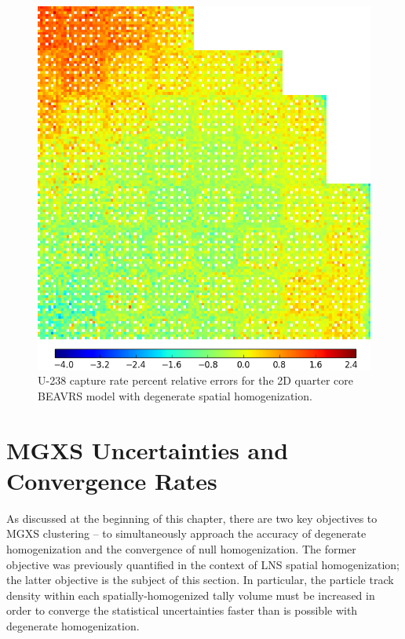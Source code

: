\begin{figure}[h!]
\centering
\includegraphics[width=\linewidth]{figures/patterns/lns/full-core/capt-err-degenerate}
\vspace{2mm}
\caption[U-238 capture rate errors for BEAVRS]{U-238 capture rate percent relative errors for the 2D quarter core \ac{BEAVRS} model with degenerate spatial homogenization.}
\label{fig:chap9-full-core-capt-err-degenerate}
\end{figure}

\clearpage


\section{MGXS Uncertainties and Convergence Rates}
\label{sec:chap9-convergence}

As discussed at the beginning of this chapter, there are two key objectives to \ac{MGXS} clustering -- to simultaneously approach the accuracy of degenerate homogenization and the convergence of null homogenization. The former objective was previously quantified in the context of \ac{LNS} spatial homogenization; the latter objective is the subject of this section. In particular, the particle track density within each spatially-homogenized tally volume must be increased in order to converge the statistical uncertainties faster than is possible with degenerate homogenization.

